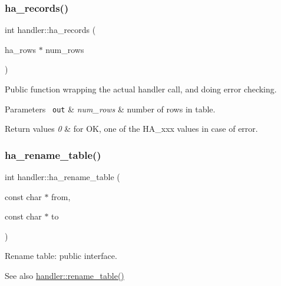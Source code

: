 \subsubsection{\texorpdfstring{ha\+\_\+records()}{ha\_records()}}
{\footnotesize\ttfamily int handler\+::ha\+\_\+records (\begin{DoxyParamCaption}\item[{ha\+\_\+rows $\ast$}]{num\+\_\+rows }\end{DoxyParamCaption})\hspace{0.3cm}{\ttfamily [inline]}}

Public function wrapping the actual handler call, and doing error checking. 
\begin{DoxyParams}[1]{Parameters}
\mbox{\texttt{ out}}  & {\em num\+\_\+rows} & number of rows in table. \\
\hline
\end{DoxyParams}

\begin{DoxyRetVals}{Return values}
{\em 0} & for OK, one of the H\+A\+\_\+xxx values in case of error. \\
\hline
\end{DoxyRetVals}
\mbox{\label{classhandler_a6ee228a60527e81efd9a49ddfdd4850d}} 
\subsubsection{\texorpdfstring{ha\+\_\+rename\+\_\+table()}{ha\_rename\_table()}}
{\footnotesize\ttfamily int handler\+::ha\+\_\+rename\+\_\+table (\begin{DoxyParamCaption}\item[{const char $\ast$}]{from,  }\item[{const char $\ast$}]{to }\end{DoxyParamCaption})}

Rename table\+: public interface.

\begin{DoxySeeAlso}{See also}
\mbox{\hyperlink{classhandler_a58bf8fa32d87654794e6b1c3b3fb8d32}{handler\+::rename\+\_\+table()}} 
\end{DoxySeeAlso}
\mbox{\label{classhandler_ad28d70543d9566894b5a81d25eca2e8e}} 
